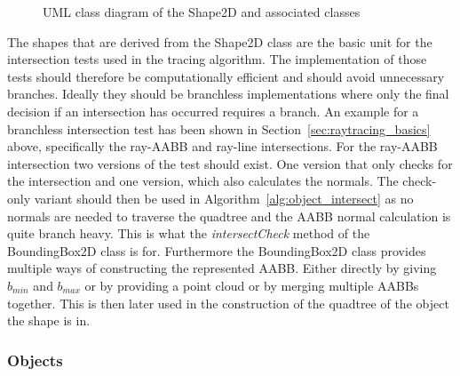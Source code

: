 \documentclass[a4paper,10pt]{article}
\newcommand{\secref}[1]{Section~\ref{#1}}
\newcommand{\algref}[1]{Algorithm~\ref{#1}}
\begin{document}
\begin{center}
\begin{figure}
    \caption{UML class diagram of the Shape2D and associated classes}
    \label{fig:uml_shape2d}
    \end{figure}
    \end{center}

    The shapes that are derived from the Shape2D class are the basic unit
    for the intersection tests used in the tracing algorithm.
    The implementation of those tests should therefore be computationally
    efficient and should avoid unnecessary branches.
    Ideally they should be branchless implementations where only the
    final decision if an intersection has occurred requires a branch.
    An example for a branchless intersection test has been shown
    in \secref{sec:raytracing_basics} above, specifically the ray-AABB
    and ray-line intersections.
    For the ray-AABB intersection two versions of the test should exist.
    One version that only checks for the intersection and one version,
    which also calculates the normals.
    The check-only variant should then be used in 
    \algref{alg:object_intersect}
    as no normals are needed to traverse the quadtree and
    the AABB normal calculation is quite branch heavy.
    This is what the \emph{intersectCheck} method of the BoundingBox2D
    class is for.
    Furthermore the BoundingBox2D class provides multiple ways of constructing
    the represented AABB.
    Either directly by giving $b_{min}$ and $b_{max}$ or by providing a point
    cloud or by merging multiple AABBs together.
    This is then later used in the construction of the quadtree of the object
    the shape is in.

    \subsubsection{Objects}
\end{document}
